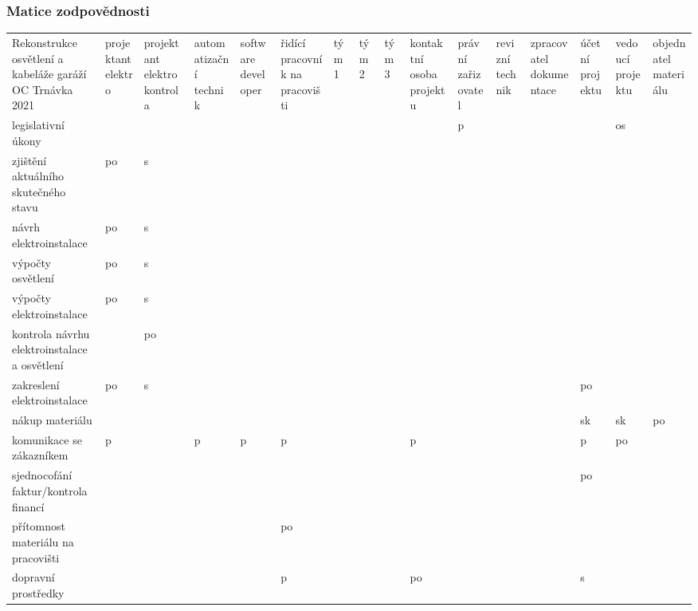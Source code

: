 \documentclass[a4paper, twoside, 11pt]{article}
\begin{document}
	\subsubsection{Matice zodpovědnosti}
		\begin{table}[H]
		\resizebox{1 \textwidth}{!}
		{
		
			\begin{tabular}{ !{\vrule width 2pt} p{3cm} !{\vrule width 2pt} p{1.5cm} | p{2cm} | p{2cm} | p{2cm} | p{2cm} | p{0.75cm} | p{0.75cm} | p{0.75cm} | p{2cm} | p{2cm} | p{2cm} | p{2cm} | p{2cm} | p{2cm} | p{2cm} !{\vrule width 2pt} }
				Rekonstrukce osvětlení a kabeláže garáží OC Trnávka 2021 & projektant elektro & projektant elektro kontrola & automatizační technik & software developer & řidící pracovník na pracovišti & tým 1 & tým 2 & tým 3 & kontaktní osoba projektu & právní zařizovatel & revizní technik & zpracovatel dokumentace & účetní projektu & vedoucí projektu & objednatel materiálu \\ 
	legislativní úkony &  &  &  &  &  &  &  &  &  & p &  &  &  & os &  \\ \hline
	zjištění aktuálního skutečného stavu & po & s~&  &  &  &  &  &  &  &  &  &  &  &  &  \\ \hline
	návrh elektroinstalace & po & s~&  &  &  &  &  &  &  &  &  &  &  &  &  \\ \hline
	výpočty osvětlení & po & s &  &  &  &  &  &  &  &  &  &  &  &  &  \\ \hline
	výpočty elektroinstalace & po & s~&  &  &  &  &  &  &  &  &  &  &  &  &  \\ \hline
	kontrola návrhu elektroinstalace a osvětlení &  & po &  &  &  &  &  &  &  &  &  &  &  &  &  \\ \hline
	zakreslení elektroinstalace & po & s~&  &  &  &  &  &  &  &  &  &  & po &  &  \\ \hline
	nákup materiálu &  &  &  &  &  &  &  &  &  &  &  &  & sk & sk & po \\ \hline
	komunikace se zákazníkem & p &  & p & p & p &  &  &  & p &  &  &  & p &  po &  \\ \hline
	sjednocofání faktur/kontrola financí &  &  &  &  &  &  &  &  &  &  &  &  & po &  &  \\ \hline
	přítomnost materiálu na pracovišti &  &  &  &  & po &  &  &  &  &  &  &  &  &  &  \\ \hline
	dopravní prostředky &  &  &  &  & p &  &  &  & po &  &  &  & s~&  &  \\ \hline

\end{tabular}}
\end{table}
\end{document}
